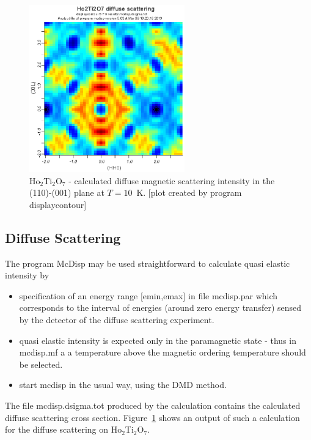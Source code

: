 \begin{figure}[t]%
\begin{center}\leavevmode
\includegraphics[angle=-0, width=0.6\textwidth]{figsrc/ho2ti2o7diffuse.eps}
\end{center}
\caption{\label{ho2ti2o7diffuse}
Ho$_2$Ti$_2$O$_7$ - calculated diffuse magnetic scattering intensity in the (110)-(001)
 plane at $T=10$~K.
[plot created by program {\prg displaycontour}]
}
\end{figure}

\subsection{Diffuse Scattering}

The program {\prg McDisp} may be used straightforward to calculate quasi elastic intensity
 by

\begin{itemize}
\item
 specification of an energy
range [emin,emax] in file {\prg mcdisp.par} which corresponds to the interval of energies (around zero
energy transfer) sensed by the detector of the diffuse scattering experiment. 
\item
 quasi elastic intensity is expected only in the paramagnetic state - thus in {\prg mcdisp.mf} a
 a temperature above the magnetic ordering temperature should be selected.
\item start {\prg mcdisp} in the usual way, using the DMD method.
\end{itemize} 
 
The file {\prg mcdisp.dsigma.tot} produced by the calculation contains the calculated diffuse scattering cross section.
Figure~\ref{ho2ti2o7diffuse} shows an output of such a calculation for the diffuse scattering
on Ho$_2$Ti$_2$O$_7$.

